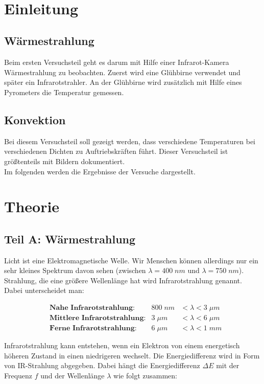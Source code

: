 \documentclass[a4paper]{scrartcl}
\def\header#1#2{
  \begin{center}
    {\Large #1}\\
    {#2}
  \end{center}
}
\numberwithin{equation}{subsection}
\begin{document}
\vspace{10pt}
\header{\HEADDING}{\SUBHEADDING}

\tableofcontents

\newpage

\section{Einleitung}
\subsection{Wärmestrahlung}

Beim ersten Versuchsteil geht es darum mit Hilfe einer Infrarot-Kamera Wärmestrahlung zu beobachten.
Zuerst wird eine Glühbirne verwendet und später ein Infrarotstrahler.
An der Glühbirne wird zusätzlich mit Hilfe eines Pyrometers die Temperatur gemessen.

\subsection{Konvektion}
Bei diesem Versuchsteil soll gezeigt werden, dass verschiedene Temperaturen bei verschiedenen Dichten zu Auftriebskräften führt.
Dieser Versuchsteil ist größtenteils mit Bildern dokumentiert.\\
Im folgenden werden die Ergebnisse der Versuche dargestellt.

\newpage
\section{Theorie}
\subsection{Teil A: Wärmestrahlung}
Licht ist eine Elektromagnetische Welle.
Wir Menschen können allerdings nur ein sehr kleines Spektrum davon sehen (zwischen $\lambda = 400\;nm$ und $\lambda = 750\;nm$).
Strahlung, die eine größere Wellenlänge hat wird Infrarotstrahlung genannt.
Dabei unterscheidet man:

\begin{align*}
&\textbf{Nahe Infrarotstrahlung:}&800\;nm &< \lambda < 3\;\mu m\\
&\textbf{Mittlere Infrarotstrahlung:}&3\;\mu m &< \lambda < 6\;\mu m\\
&\textbf{Ferne Infrarotstrahlung:}&6\;\mu m &< \lambda < 1\;mm
\end{align*}

Infrarotstrahlung kann entstehen, wenn ein Elektron von einem energetisch höheren Zustand in einen niedrigeren wechselt.
Die Energiedifferenz wird in Form von IR-Strahlung abgegeben.
Dabei hängt die Energiedifferenz $\Delta E$ mit der Frequenz $f$ und der Wellenlänge $\lambda$ wie folgt zusammen:
\end{document}
